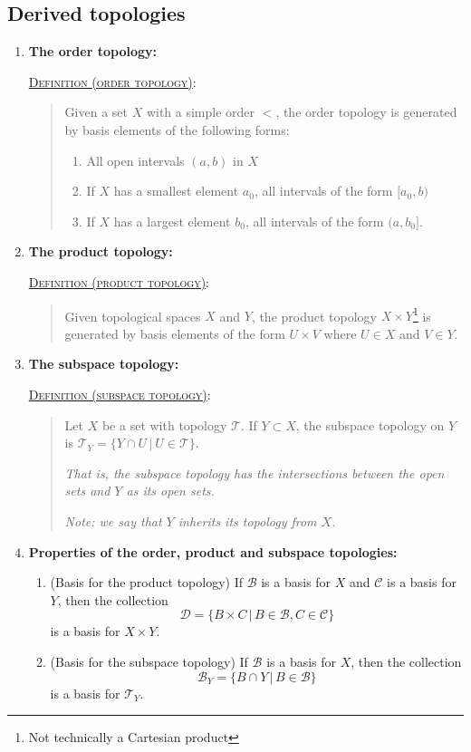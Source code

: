 \documentclass[letterpaper, 12pt]{article}
\newcommand{\ms}[1]{\mathscr{#1}}
\newcommand{\defn}[2]{\textsc{\underline{Definition (#1)}:}\begin{quote} #2\end{quote}}
\begin{document}
    \subsection{Derived topologies}
        \begin{enumerate}[resume]
        \item \textbf{The order topology:}

            \defn{order topology}{Given a set $X$ with a simple order $<$, the order topology is generated by basis elements of the following forms:
            \begin{enumerate}
            \item All open intervals $(a, b)$ in $X$
            \item If $X$ has a smallest element $a_0$, all intervals of the form $[a_0, b)$
            \item If $X$ has a largest element $b_0$, all intervals of the form $(a, b_0]$.
            \end{enumerate}
            }
        \item \textbf{The product topology:}

            \defn{product topology}{Given topological spaces $X$ and $Y$, the product topology $X\times Y$\footnote{Not technically a Cartesian product} is generated by basis elements of the form $U\times V$ where $U\in X$ and $V\in Y$.}
        \item \textbf{The subspace topology:}

            \defn{subspace topology}{Let $X$ be a set with topology $\ms{T}$. If $Y\subset X$, the subspace topology on $Y$ is $\ms{T}_Y = \{Y\cap U\,|\ U\in\ms{T}\}$.

            \textit{That is, the subspace topology has the intersections between the open sets and $Y$ as its open sets.}

            \textit{Note: we say that $Y$ inherits its topology from $X$.}}
        \item \textbf{Properties of the order, product and subspace topologies:}
            \begin{enumerate}
            \item (Basis for the product topology) If $\ms{B}$ is a basis for $X$ and $\ms{C}$ is a basis for $Y$, then the collection \[\ms{D} = \{B\times C\,|\, B\in\ms{B}, C\in\ms{C}\}\] is a basis for $X\times Y$.
            \item (Basis for the subspace topology) If $\ms{B}$ is a basis for $X$, then the collection \[\ms{B}_Y = \{B \cap Y\,|\, B\in\ms{B}\}\] is a basis for $\ms{T}_Y$.


\end{enumerate}
\end{enumerate}
\end{document}
